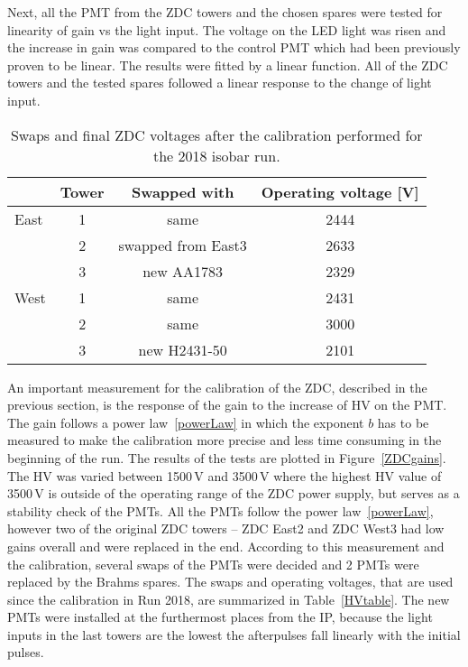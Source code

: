 Next, all the PMT from the ZDC towers and the chosen spares were tested for linearity of gain vs the light input. The voltage on the LED light was risen and the increase in gain was compared to the control PMT which had been previously proven to be linear. The results were fitted by a linear function. All of the ZDC towers and the tested spares followed a linear response to the change of light input.


\begin{table}[!htb] 
\caption[Swaps and final ZDC voltages after the calibration performed for the 2018 isobar run]{\label{HVtable}Swaps and final ZDC voltages after the calibration performed for the 2018 isobar run.}
\label{corected}
\begin{center}
\begin{tabular}{lccc}
\toprule
 &Tower&Swapped with&Operating voltage [V]\\
\midrule
East  &1 & same & 2444 \\
      &2 & swapped from East3 & 2633 \\
      &3 & new AA1783 & 2329 \\
\midrule
West  &1 & same & 2431  \\
      &2 & same & 3000  \\
      &3 & new H2431-50 & 2101 \\
\bottomrule
\end{tabular}
\end{center}
\end{table}


An important measurement for the calibration of the ZDC, described in the previous section, is the response of the gain to the increase of HV on the PMT\@. The gain follows a power law~\eqref{powerLaw} in which the exponent $b$ has to be measured to make the calibration more precise and less time consuming in the beginning of the run. The results of the tests are plotted in Figure~\ref{ZDCgains}\@. The HV was varied between 1500$\,$V and 3500$\,$V where the highest HV value of 3500$\,$V is outside of the operating range of the ZDC power supply, but serves as a stability check of the PMTs. All the PMTs follow the power law~\eqref{powerLaw}, however two of the original ZDC towers -- ZDC East2 and ZDC West3 had low gains overall and were replaced in the end. According to this measurement and the calibration, several swaps of the PMTs were decided and 2 PMTs were replaced by the Brahms spares. The swaps and operating voltages, that are used since the calibration in Run 2018, are summarized in Table~\ref{HVtable}\@. The new PMTs were installed at the furthermost places from the IP, because the light inputs in the last towers are the lowest the afterpulses fall linearly with the initial pulses. 



